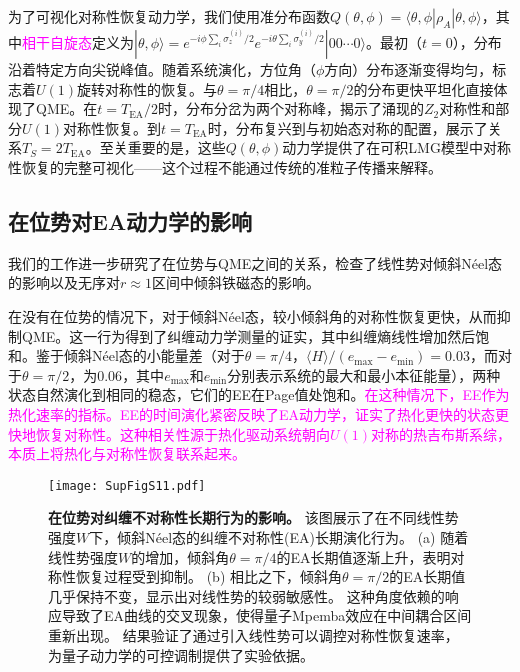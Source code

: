 \documentclass[11pt,a4paper]{article}
\begin{document}
为了可视化对称性恢复动力学，我们使用准分布函数$Q(\theta,\phi)=\langle\theta,\phi|\rho_A|\theta,\phi\rangle$，其中\textcolor{magenta}{相干自旋态}定义为$|\theta,\phi\rangle=e^{-i\phi\sum_i\sigma_z^{(i)}/2}e^{-i\theta\sum_i\sigma_y^{(i)}/2}|00\cdots 0\rangle$。最初（$t=0$），分布沿着特定方向尖锐峰值。随着系统演化，方位角（$\phi$方向）分布逐渐变得均匀，标志着$U(1)$旋转对称性的恢复。与$\theta=\pi/4$相比，$\theta=\pi/2$的分布更快平坦化直接体现了QME。在$t=T_{\text{EA}}/2$时，分布分岔为两个对称峰，揭示了涌现的$Z_2$对称性和部分$U(1)$对称性恢复。到$t=T_{\text{EA}}$时，分布复兴到与初始态对称的配置，展示了关系$T_S=2T_{\text{EA}}$。至关重要的是，这些$Q(\theta,\phi)$动力学提供了在可积LMG模型中对称性恢复的完整可视化——这个过程不能通过传统的准粒子传播来解释。

\subsection{在位势对EA动力学的影响}




我们的工作进一步研究了在位势与QME之间的关系，检查了线性势对倾斜Néel态的影响以及无序对$r\approx 1$区间中倾斜铁磁态的影响。

在没有在位势的情况下，对于倾斜Néel态，较小倾斜角的对称性恢复更快，从而抑制QME。这一行为得到了纠缠动力学测量的证实，其中纠缠熵线性增加然后饱和。鉴于倾斜Néel态的小能量差（对于$\theta=\pi/4$，$\langle H\rangle/(e_{\text{max}}-e_{\text{min}})=0.03$，而对于$\theta=\pi/2$，为$0.06$，其中$e_{\text{max}}$和$e_{\text{min}}$分别表示系统的最大和最小本征能量），两种状态自然演化到相同的稳态，它们的EE在Page值处饱和。\textcolor{magenta}{在这种情况下，EE作为热化速率的指标。EE的时间演化紧密反映了EA动力学，证实了热化更快的状态更快地恢复对称性。这种相关性源于热化驱动系统朝向$U(1)$对称的热吉布斯系综，本质上将热化与对称性恢复联系起来。}

\begin{figure}[H]
    \centering
    \texttt{[image: SupFigS11.pdf]}
    \caption{
        \textbf{在位势对纠缠不对称性长期行为的影响。}
        该图展示了在不同线性势强度$W$下，倾斜Néel态的纠缠不对称性(EA)长期演化行为。
        (a) 随着线性势强度$W$的增加，倾斜角$\theta=\pi/4$的EA长期值逐渐上升，表明对称性恢复过程受到抑制。
        (b) 相比之下，倾斜角$\theta=\pi/2$的EA长期值几乎保持不变，显示出对线性势的较弱敏感性。
        这种角度依赖的响应导致了EA曲线的交叉现象，使得量子Mpemba效应在中间耦合区间重新出现。
        结果验证了通过引入线性势可以调控对称性恢复速率，为量子动力学的可控调制提供了实验依据。
    }
    \label{fig:onsite_potential_EA_effects}
\end{figure}
\end{document}

